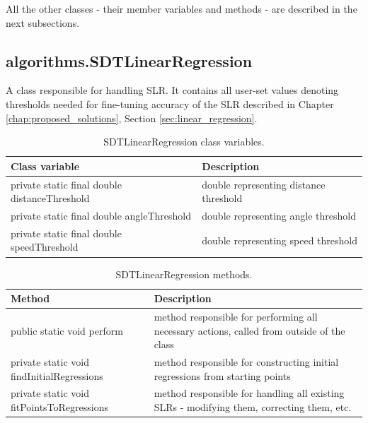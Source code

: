 	All the other classes - their member variables and methods - are described in the next subsections.
	
\newpage
	
\subsection{algorithms.SDTLinearRegression}\label{subsec:slr}

	A class responsible for handling SLR. It contains all user-set values denoting thresholds needed for fine-tuning accuracy of the SLR described in Chapter \ref{chap:proposed_solutions}, Section \ref{sec:linear_regression}.
	
\begin{table}[H]
\centering
\setlength{\extrarowheight}{2pt}
\begin{tabularx}{\textwidth}{|X|X|}
\hline
\textbf{Class variable} & \textbf{Description} \\ \hline
private static final double \mbox{distanceThreshold} & double representing distance threshold \\ \hline
private static final double \mbox{angleThreshold} & double representing angle threshold    \\ \hline
private static final double \mbox{speedThreshold} & double representing speed threshold    \\ \hline
\end{tabularx}
\caption{SDTLinearRegression class variables.}
\label{tab:class_variables_LR}
\end{table}

\begin{table}[H]
\centering
\setlength{\extrarowheight}{2pt}
\begin{tabularx}{\textwidth}{|X|X|}
\hline
\textbf{Method} & \textbf{Description} \\ \hline
public static void \mbox{perform} & method responsible for performing all necessary actions, called from outside of the class \\ \hline
private static void \mbox{findInitialRegressions} & method responsible for constructing initial regressions from starting points\\ \hline
private static void \mbox{fitPointsToRegressions} & method responsible for handling all existing SLRs - modifying them, correcting them, etc.\\ \hline
\end{tabularx}
\caption{SDTLinearRegression methods.}
\label{tab:class_methods_LR}
\end{table}

